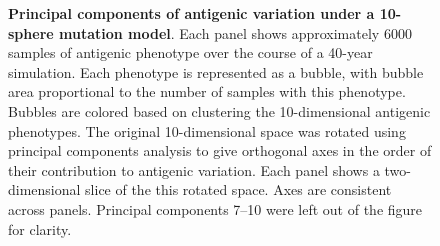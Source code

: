 \documentclass[11pt,oneside,letterpaper]{article}
\begin{document}
\begin{figure}[H]
	\centering
	\caption{\textbf{Principal components of antigenic variation under a 10-sphere mutation model}. Each panel shows approximately 6000 samples of antigenic phenotype over the course of a 40-year simulation.  Each phenotype is represented as a bubble, with bubble area proportional to the number of samples with this phenotype.  Bubbles are colored based on clustering the 10-dimensional antigenic phenotypes.  The original 10-dimensional space was rotated using principal components analysis to give orthogonal axes in the order of their contribution to antigenic variation.  Each panel shows a two-dimensional slice of the this rotated space.  Axes are consistent across panels.  Principal components 7--10 were left out of the figure for clarity.}
	\label{10dgrid}
\end{figure}
\end{document}
